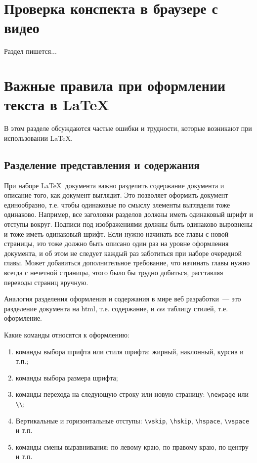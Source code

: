 \documentclass{article}
\begin{document}
    \section{Проверка конспекта в браузере с видео}
    Раздел пишется...

    \section{Важные правила при оформлении текста в LaTeX}

    В этом разделе обсуждаются частые ошибки и трудности, которые возникают при
    использовании \LaTeX.

    \subsection{Разделение представления и содержания}

    При наборе \LaTeX\ документа важно разделить содержание документа и описание того,
    как документ выглядит.
    Это позволяет оформить документ единообразно, т.е. чтобы одинаковые по смыслу элементы
    выглядели тоже одинаково. Например, все заголовки разделов должны иметь одинаковый шрифт
    и отступы вокруг. Подписи под изображениями должны быть одинаково выровнены и тоже иметь
    одинаковый шрифт. Если нужно начинать все главы с новой страницы,
    это тоже должно быть описано один раз на уровне оформления документа, и об
    этом не следует каждый раз заботиться при наборе очередной главы. Может добавиться
    дополнительное требование, что начинать главы нужно всегда с нечетной страницы, этого
    было бы трудно добиться, расставляя переводы страниц вручную.

    Аналогия разделения оформления и содержания в мире веб разработки~--- это разделение
    документа на html, т.е. содержание, и css таблицу стилей, т.е. оформление.

    Какие команды относятся к оформлению:
    \begin{enumerate}
        \item команды выбора шрифта или стиля шрифта: жирный, наклонный, курсив и т.п.;
        \item команды выбора размера шрифта;
        \item команды перехода на следующую строку или новую страницу: \verb|\newpage|
        или \verb|\\|;
        \item Вертикальные и горизонтальные отступы: \verb|\vskip|, \verb|\hskip|,
        \verb|\hspace|, \verb|\vspace| и т.п.
        \item команды смены выравнивания: по левому краю, по правому краю, по центру и т.п.
    \end{enumerate}
\end{document}
